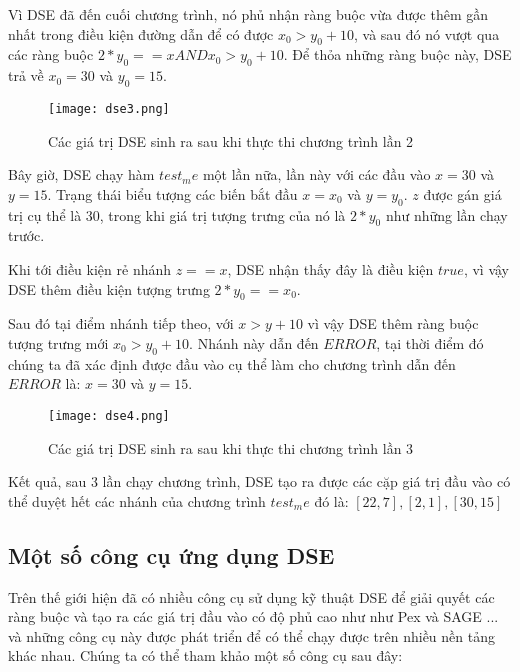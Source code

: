 Vì DSE đã đến cuối chương trình, nó phủ nhận ràng buộc vừa được thêm gần nhất trong điều kiện đường dẫn để có được $ x_{0} > y_{0} + 10 $, và sau đó nó vượt qua các ràng buộc $ 2*y_{0} == x  AND x_{0} > y_{0} + 10$. Để thỏa những ràng buộc này, DSE trả về $x_{0} = 30$ và $y_{0} = 15$.

\begin{center}
	\begin{figure}[H]
		\begin{center}
			\texttt{[image: dse3.png]}
		\end{center}
		\caption{Các giá trị DSE sinh ra sau khi thực thi chương trình lần 2}
		\label{dse3}
	\end{figure}
\end{center}

Bây giờ, DSE chạy hàm $test_me$ một lần nữa, lần này với các đầu vào $x = 30$ và $y = 15$. Trạng thái biểu tượng các biến bắt đầu $x = x_{0}$ và $y = y_{0}$. $z$ được gán giá trị cụ thể là $30$, trong khi giá trị tượng trưng của nó là $2*y_0$ như những lần chạy trước.

Khi tới điều kiện rẻ nhánh $z == x$, DSE nhận thấy đây là điều kiện $true$, vì vậy DSE thêm điều kiện tượng trưng $2*y_{0} == x_{0}$.

Sau đó tại điểm nhánh tiếp theo, với $x > y + 10$ vì vậy DSE thêm ràng buộc tượng trưng mới $ x_{0} > y_{0}+ 10 $. Nhánh này dẫn đến $ERROR$, tại thời điểm đó chúng ta đã xác định được đầu vào cụ thể làm cho chương trình dẫn đến $ERROR$ là: $x = 30$ và $y = 15$.

\begin{center}
	\begin{figure}[H]
		\begin{center}
			\texttt{[image: dse4.png]}
		\end{center}
		\caption{Các giá trị DSE sinh ra sau khi thực thi chương trình lần 3}
		\label{dse4}
	\end{figure}
\end{center}

Kết quả, sau 3 lần chạy chương trình, DSE tạo ra được các cặp giá trị đầu vào có thể duyệt hết các nhánh của chương trình $test_me$ đó là: $[22,7], [2,1], [30,15]$
	
\subsection{Một số công cụ ứng dụng DSE}	
Trên thế giới hiện đã có nhiều công cụ sử dụng kỹ thuật DSE để giải quyết các ràng buộc và tạo ra các giá trị đầu vào có độ phủ cao như như Pex \cite{tillmann2008pex} và SAGE \cite{godefroid2008automated}... và những công cụ này được phát triển để có thể chạy được trên nhiều nền tảng khác nhau. Chúng ta có thể tham khảo một số công cụ sau đây:
		

